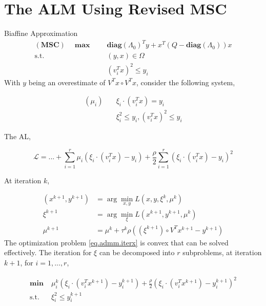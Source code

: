 \documentclass[aspectratio=1610, 9pt]{beamer}
\newcommand{\diag}{\textbf{diag}}
\newcommand{\model}[1]{(\textbf{#1})}
\newcommand{\mx}{\mathbf{\max}\;}
\newcommand{\mn}{\mathbf{\min}\;}
\newcommand{\st}{\mathrm{s.t.\;}}
\begin{document}
\section{The ALM Using Revised MSC}
\begin{frame}[allowframebreaks]{Biaffine Approximation}
  \begin{align}
    \model{MSC} \quad \mx \quad & \diag(\Lambda_0)^Ty + x^T\left(Q - \diag(\Lambda_0)\right)x \\
    \mathrm{s.t.} \quad         & (y, x) \in \Omega                                           \\
                                & (v_i^Tx)^2 \le y_i
  \end{align}
  With \(y\) being an overestimate of \(V^Tx \circ V^Tx\), consider the following system,

  \begin{align*}
    ( \mu_i)    \quad & \xi_i \cdot (v_i^Tx) = y_i           \\
                      & \xi_i^2 \le y_i,  (v_i^Tx)^2 \le y_i
  \end{align*}


  The AL,

  \begin{equation}
    \mathcal L = ... + \sum_{i=1}^r \mu_i \left (\xi_i \cdot(v_i^Tx) - y_i\right) + \frac{\rho}{2}\sum_{i=1}^r \left(\xi_i \cdot (v_i^Tx) - y_i\right)^2
  \end{equation}

  At iteration \(k\),

  \begin{subequations}
    \begin{align}
      \label{eq.admm.iterx}   (x^{k+1}, y^{k+1}) & = \arg\min_{x, y} L\left(x,y,\xi^k,\mu^k\right)                         \\
      \label{eq.admm.iterxi}   \xi^{k+1}         & = \arg\min_{\xi} L\left(x^{k+1}, y^{k+1}, \mu^k\right)                  \\
      \mu^{k+1}                                  & = \mu^k + \tau^k\rho\left((\xi^{k+1})\circ V^T x^{k+1} - y^{k+1}\right)
    \end{align}
  \end{subequations}
  The optimization problem \eqref{eq.admm.iterx} is convex that can be solved effectively. The iteration for \(\xi\) can be decomposed into \(r\) subproblems, at iteration \(k+1\), for \(i = 1, ..., r\),

  \begin{equation}
    \begin{aligned}
      \mn & \mu_i^k \left (\xi_i \cdot(v_i^Tx^{k+1}) - y_i^{k+1}\right) + \frac{\rho}{2} \left(\xi_i \cdot (v_i^Tx^{k+1}) - y_i^{k+1}\right)^2 \\
      \st & \xi_i^2 \le y_i^{k+1}
    \end{aligned}
  \end{equation}


\end{frame}
\end{document}
